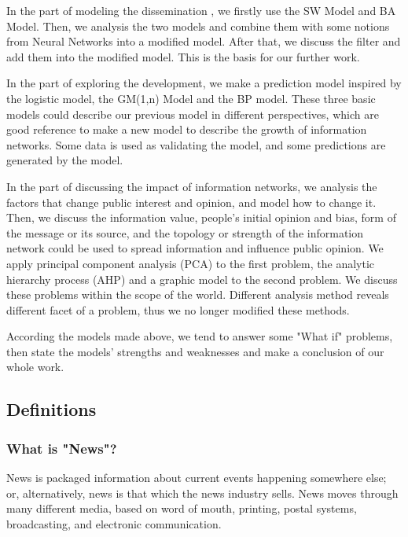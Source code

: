  \par In the part of modeling the dissemination , we firstly use the SW Model and BA Model. Then, we analysis the two models and combine them with some notions from Neural Networks into a modified model. After that, we discuss the filter and add them into the modified model. This is the basis for our further work.
 
 \par In the part of exploring the development, we make a prediction model inspired by the logistic model, the GM(1,n) Model and the BP model. These three basic models could describe our previous model in different perspectives, which are good reference to make a new model to describe the growth of information networks. Some data is used as validating the model, and some predictions are generated by the model.
 
 \par In the part of discussing the impact of information networks, we analysis the factors that change public interest and opinion, and model how to change it. Then, we discuss the information value, people's initial opinion and bias, form of the message or its source, and the topology or strength of the information network could be used to spread information and influence public opinion. We apply principal component analysis (PCA) to the first problem, the analytic hierarchy process (AHP) and a graphic model to the second problem. We discuss these problems within the scope of the world. Different analysis method reveals different facet of a problem, thus we no longer modified these methods.

 
 \par According the models made above, we tend to answer some "What if" problems, then state the models' strengths and weaknesses and make a conclusion of our whole work. 
 
 

\subsection{Definitions}
\subsubsection*{What is "News"?}
News is packaged information about current events happening somewhere else; or, alternatively, news is that which the news industry sells. News moves through many different media, based on word of mouth, printing, postal systems, broadcasting, and electronic communication.

